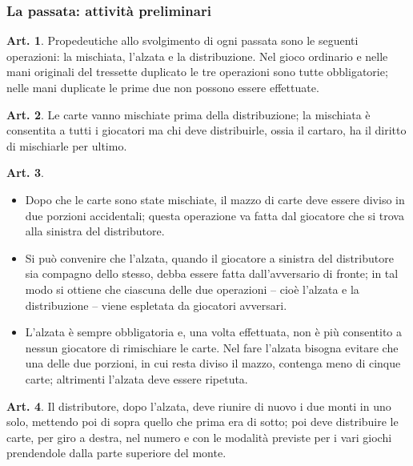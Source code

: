 \documentclass[italian,a4paper]{article}
\theoremstyle{definition}
\newtheorem{art}{Art.}
\newenvironment{packeditem}{
\begin{itemize}
  \setlength{\itemsep}{1pt}
  \setlength{\parskip}{0pt}
  \setlength{\parsep}{0pt}
}{\end{itemize}}
\begin{document}
\subsubsection{La passata: attività preliminari}
\begin{art}
    Propedeutiche allo svolgimento di ogni passata sono le seguenti operazioni: la mischiata, l'alzata e la distribuzione.
    Nel gioco ordinario e nelle mani originali del tressette duplicato le tre operazioni sono tutte obbligatorie; nelle mani duplicate  le prime due non possono essere effettuate.
\end{art}
\begin{art}
    Le carte vanno mischiate prima della distribuzione; la mischiata è consentita a tutti i giocatori ma chi deve distribuirle, ossia il cartaro, ha il diritto di mischiarle per ultimo.
\end{art}
\begin{art} \hspace*{\fill}
    \begin{packeditem}
\item Dopo che le carte sono state mischiate, il mazzo di carte deve essere diviso in due porzioni accidentali; questa operazione va fatta dal giocatore che si trova alla sinistra del distributore.
\item Si può convenire che l'alzata, quando il giocatore a sinistra del distributore sia compagno dello stesso, debba essere fatta dall'avversario di fronte; in tal modo si ottiene che ciascuna delle due operazioni – cioè l'alzata e la distribuzione – viene espletata da giocatori avversari.
\item L'alzata è sempre obbligatoria e, una volta effettuata, non è più consentito a nessun giocatore di rimischiare le carte. Nel fare l'alzata bisogna evitare che una delle due porzioni, in cui resta diviso il mazzo, contenga meno di cinque carte; altrimenti l'alzata deve essere ripetuta.
    \end{packeditem}
\end{art}
\begin{art}
    Il distributore, dopo l'alzata, deve riunire di nuovo i due monti in uno solo, mettendo poi di sopra quello che prima era di sotto; poi deve distribuire le carte, per giro a destra, nel numero e con le modalità previste per i vari giochi prendendole dalla parte superiore del monte.
\end{art}
\end{document}
